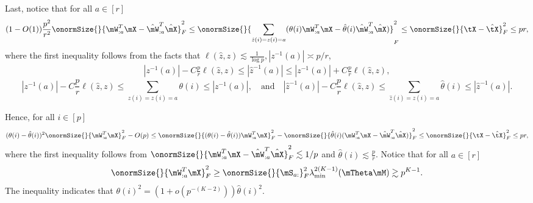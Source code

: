 \documentclass[lettersize,onecolumn,journal]{IEEEtran}
\theoremstyle{definition}
\theoremstyle{definition}
\begin{document}
{Last, notice that for all $a \in [r]$
\begin{align}
    (1 - O(1)) \frac{p^2}{r^2}\onormSize{}{\mW_{:a}^T \mX - \hat \mW_{:a}^T \hat \mX}_F^2 \leq  \onormSize{}{ \sum_{\hat z(i) = z(i) = a} (\theta(i) \mW_{:a}^T \mX  - \hat \theta(i) \hat \mW_{:a}^T \hat \mX)}_F^2 \leq \onormSize{}{\tX - \hat \tX}_F^2 \leq p r,
\end{align}
where the first inequality follows from the facts that  $\ell(\hat z, z) \lesssim \frac{1}{\log p}, |z^{-1}(a)| \asymp p /r$, 
\begin{align}
     | z^{-1}(a)| - C \frac{p}{r} \ell(\hat z, z)  \leq |\hat z^{-1}(a)| \leq | z^{-1}(a)| + C \frac{p}{r} \ell(\hat z, z), 
\end{align}
\begin{equation}
  | z^{-1}(a)|  - C \frac{p}{r} \ell( \hat z,z)  \leq \sum_{ z(i) = z(i) = a} \theta(i) \leq | z^{-1}(a)|, \quad \text{and} \quad |\hat z^{-1}(a)|  - C \frac{p}{r} \ell(\hat z, z)  \leq \sum_{\hat z(i) = z(i) = a} \hat \theta(i) \leq |\hat z^{-1}(a)|.
\end{equation}

Hence, for all $i \in [p]$
\begin{align}\label{eq:theta_hat}
  (\theta(i) - \hat \theta(i))^2 \onormSize{}{ \mW_{:a}^T \mX }_F^2 - O(p) \leq  \onormSize{}{ (\theta(i) - \hat \theta(i))\mW_{:a}^T \mX }_F^2 - \onormSize{}{ \hat \theta(i) (\mW_{:a}^T \mX - \hat \mW_{:a}^T \hat \mX) }_F^2 \leq \onormSize{}{\tX - \hat \tX}_F^2 \leq p r,
\end{align}
where the first inequality follows from $\onormSize{}{\mW_{:a}^T \mX - \hat \mW_{:a}^T \hat \mX}_F^2 \lesssim 1/p$ and $\hat \theta(i) \lesssim \frac{p}{r}$. Notice that for all $a \in [r]$
\begin{equation}
    \onormSize{}{\mW_{:a}^T \mX}_F^2 \geq \onormSize{}{\mS_{a:}}_F^2 \lambda_{\min}^{2(K-1)}(\mTheta \mM) \gtrsim p^{K-1}.
\end{equation}
The inequality indicates that $\theta(i)^2 = (1 + o(p^{-(K-2)})) \hat \theta(i)^2$. 


}
 
\end{document}
